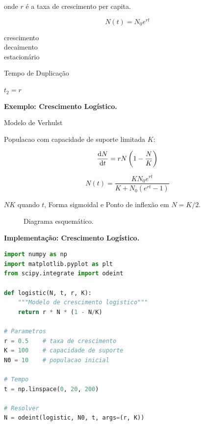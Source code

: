 onde $r$ é a taxa de crescimento per capita.

%
\begin{equation*}
N(t) = N_0 e^{rt}
\end{equation*}
%

 crescimento\\

 decaimento\\

 estacionário

Tempo de Duplicação

$t_2 = r$

\textbf{Exemplo: Crescimento Logístico.}

Modelo de Verhulst

Populacao com capacidade de suporte limitada $K$:

%
\begin{equation*}
\frac{\mathrm{d} N}{\mathrm{d} t} = rN\left(1 - \frac{N}{K}\right)
\end{equation*}
%

%
\begin{equation*}
N(t) = \frac{K N_0 e^{rt}}{K + N_0(e^{rt} - 1)}
\end{equation*}
%

$N K$ quando $t $, Forma sigmoidal e Ponto de inflexão em $N = K/2$.

%
\begin{figure}[htbp]
\centering
{}
\caption{Diagrama esquemático.}
\end{figure}
%

\textbf{Implementação: Crescimento Logístico.}

%
\begin{lstlisting}[language=Python, caption=Modelo logístico, basicstyle=\ttfamily\footnotesize]
import numpy as np
import matplotlib.pyplot as plt
from scipy.integrate import odeint

def logistic(N, t, r, K):
    """Modelo de crescimento logistico"""
    return r * N * (1 - N/K)

# Parametros
r = 0.5    # taxa de crescimento
K = 100    # capacidade de suporte
N0 = 10    # populacao inicial

# Tempo
t = np.linspace(0, 20, 200)

# Resolver
N = odeint(logistic, N0, t, args=(r, K))
\end{lstlisting}
%

